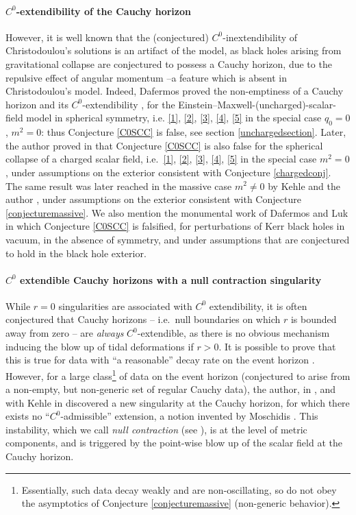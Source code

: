 \documentclass[10pt,a4paper]{article}
\theoremstyle{plain}
\theoremstyle{remark}
\theoremstyle{definition}
\theoremstyle{plain}
\theoremstyle{remark}
\theoremstyle{definition}
\numberwithin{equation}{section}
\begin{document}
\paragraph{$C^0$-extendibility of the Cauchy horizon} However, it is well known that the (conjectured) $C^0$-inextendibility of Christodoulou's solutions is an artifact of the model, as black holes arising from gravitational collapse are conjectured to possess a Cauchy horizon, due to the repulsive effect of angular momentum --a feature which is absent in Christodoulou's model. Indeed, Dafermos proved the non-emptiness of a Cauchy horizon and its $C^0$-extendibility \cite{Mihalis1}, \cite{MihalisPHD} for the Einstein--Maxwell-(uncharged)-scalar-field model in spherical symmetry,  i.e. \eqref{1}, \eqref{2}, \eqref{3}, \eqref{4}, \eqref{5} in the special case $q_0 = 0$, $m^2=0$: thus Conjecture \ref{C0SCC} is false, see section \ref{unchargedsection}. Later, the author proved in \cite{Moi} that Conjecture \ref{C0SCC} is also false for the spherical collapse of a charged scalar field, i.e.\ \eqref{1}, \eqref{2}, \eqref{3}, \eqref{4}, \eqref{5} in the special case $m^2=0$, under assumptions on the exterior consistent with Conjecture \ref{chargedconj}. The same result was later reached in the massive case $m^2 \neq 0$ by Kehle and the author \cite{Moi3Christoph}, under assumptions on the exterior consistent with Conjecture \ref{conjecturemassive}. We also mention the monumental work of Dafermos and Luk \cite{KerrStab} in which Conjecture \ref{C0SCC} is falsified, for perturbations of Kerr black holes in vacuum, in the absence of symmetry, and under assumptions that are conjectured to hold in the black hole exterior. \color{black}
\paragraph{$C^0$ extendible Cauchy horizons with a null contraction singularity}

While $r=0$ singularities are associated with $C^0$ extendibility, it is often conjectured that Cauchy horizons -- i.e.\ null boundaries on which $r$ is bounded away from zero -- are \textit{always} $C^0$-extendible, as there is no obvious mechanism inducing the blow up of tidal deformations if $r>0$. It is possible to prove that this is true for data with ``a reasonable'' decay rate on the event horizon \cite{Moi4Christoph}. However, for a large class\footnote{Essentially, such data decay weakly and are non-oscillating, so do not obey the asymptotics of Conjecture \ref{conjecturemassive} (non-generic behavior).} of data on the event horizon (conjectured to arise from a non-empty, but non-generic set of regular Cauchy data), the author, in \cite{MoiThesis}, and with Kehle in \cite{Moi4Christoph} discovered a new singularity at the Cauchy horizon, for which there exists no ``$C^0$-admissible'' extension, a notion invented by Moschidis \cite{Moschidis}. This instability, which we call \textit{null contraction} (see \cite{Moi4Christoph}), is at the level of metric components, and is triggered by the point-wise blow up of the scalar field at the Cauchy horizon.
\end{document}
